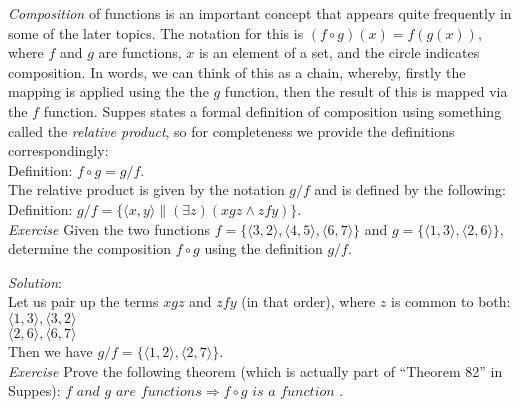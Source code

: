 \textit{Composition}  of functions is an important concept that appears quite frequently in some of the later topics.  The notation for this is $(f \circ g)(x)=f(g(x))$, where $f$ and $g$ are functions, $x$ is an element of a set, and the circle indicates composition.  In words, we can think of this as a chain, whereby, firstly the mapping is applied using the the $g$ function, then the result of this is mapped via the $f$ function.  Suppes states a formal definition of composition using something called the \textit{relative product}, so for completeness we provide the definitions correspondingly:\\

Definition: $f \circ g = g/f$.\\

The relative product is given by the notation $g/f$ and is defined by the following:\\

Definition: $g/f = \{\langle x,y \rangle\| (\exists z)(x g z \land z f y )\}$.\\

\textit{Exercise}  Given the two functions $f=\{\langle 3,2 \rangle, \langle 4,5 \rangle, \langle 6, 7 \rangle \}$ and $g=\{\langle 1,3 \rangle , \langle 2,6 \rangle \}$, determine the composition $f \circ g$ using the definition $g/f$.

\textit{Solution}:\\
Let us pair up the terms $x g z$ and $z f y$ (in that order), where $z$ is common to both:\\
$\langle 1, 3 \rangle , \langle 3, 2 \rangle$\\
$\langle 2, 6 \rangle , \langle 6, 7 \rangle$\\

Then we have $g/f = \{\langle 1,2 \rangle, \langle 2, 7 \rangle \}$.\\

\textit{Exercise} Prove the following theorem (which is actually part of ``Theorem 82'' in Suppes): $f \textit{ and }g \textit{ are functions} \Longrightarrow f \circ g \textit{ is a function }$.\\

